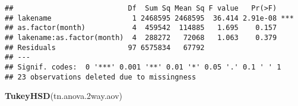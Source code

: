 \documentclass[]{article}
\newenvironment{Shaded}{\begin{snugshade}}{\end{snugshade}}
\newcommand{\FloatTok}[1]{\textcolor[rgb]{0.00,0.00,0.81}{#1}}
\newcommand{\KeywordTok}[1]{\textcolor[rgb]{0.13,0.29,0.53}{\textbf{#1}}}
\newcommand{\NormalTok}[1]{#1}
\begin{document}
\begin{verbatim}
##                           Df  Sum Sq Mean Sq F value   Pr(>F)    
## lakename                   1 2468595 2468595  36.414 2.91e-08 ***
## as.factor(month)           4  459542  114885   1.695    0.157    
## lakename:as.factor(month)  4  288272   72068   1.063    0.379    
## Residuals                 97 6575834   67792                     
## ---
## Signif. codes:  0 '***' 0.001 '**' 0.01 '*' 0.05 '.' 0.1 ' ' 1
## 23 observations deleted due to missingness
\end{verbatim}

\begin{Shaded}
\begin{Highlighting}[]
\KeywordTok{TukeyHSD}\NormalTok{(tn.anova}\FloatTok{.2}\NormalTok{way.aov)}
\end{Highlighting}
\end{Shaded}
\end{document}
